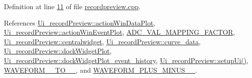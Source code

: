 Definition at line \hyperlink{a00129_source_l00011}{11} of file \hyperlink{a00129_source}{recordpreview.\+cpp}.



References \hyperlink{a00140_source_l00034}{Ui\+\_\+record\+Preview\+::action\+Win\+Data\+Plot}, \hyperlink{a00140_source_l00039}{Ui\+\_\+record\+Preview\+::action\+Win\+Event\+Plot}, \hyperlink{a00086_source_l00075}{A\+D\+C\+\_\+\+V\+A\+L\+\_\+\+M\+A\+P\+P\+I\+N\+G\+\_\+\+F\+A\+C\+T\+O\+R}, \hyperlink{a00140_source_l00040}{Ui\+\_\+record\+Preview\+::centralwidget}, \hyperlink{a00140_source_l00057}{Ui\+\_\+record\+Preview\+::curve\+\_\+data}, \hyperlink{a00140_source_l00053}{Ui\+\_\+record\+Preview\+::dock\+Widget\+Plot}, \hyperlink{a00140_source_l00041}{Ui\+\_\+record\+Preview\+::dock\+Widget\+Plot\+\_\+event\+\_\+history}, \hyperlink{a00140_source_l00060}{Ui\+\_\+record\+Preview\+::setup\+Ui()}, \hyperlink{a00090_source_l00039}{W\+A\+V\+E\+F\+O\+R\+M\+\_\+\_\+\+T\+O\+\_\+\_}, and \hyperlink{a00090_source_l00040}{W\+A\+V\+E\+F\+O\+R\+M\+\_\+\+P\+L\+U\+S\+\_\+\+M\+I\+N\+U\+S\+\_\+\_}.


